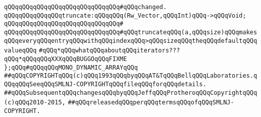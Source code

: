 \verb|qQQqqQQqqQQqqQQqqQQqqQQqqQQqqQQq#qQQqchanged.|\newline
\newline
\newline
\verb|qQQqqQQqqQQqqQQqtruncate:qQQqqQQq(Rw_Vector,qQQqInt)qQQq->qQQqVoid;|\newline
\verb|qQQqqQQqqQQqqQQqqQQqqQQqqQQqqQQq#|\newline
\verb|qQQqqQQqqQQqqQQqqQQqqQQqqQQqqQQq#qQQqtruncateqQQq(a,qQQqsize)qQQqmakesqQQqeveryqQQqentryqQQqwithqQQqindexqQQq>qQQqsizeqQQqtheqQQqdefaultqQQqvalueqQQq|\newline
\newline
\verb|#qQQq*qQQqwhatqQQqaboutqQQqiterators???qQQq*qQQqqQQqXXXqQQqBUGGOqQQqFIXME|\newline
\newline
\verb|};qQQq#qQQqqQQqMONO_DYNAMIC_ARRAYqQQq|\newline
\newline
\newline
\newline
\verb|##qQQqCOPYRIGHTqQQq(c)qQQq1993qQQqbyqQQqAT&TqQQqBellqQQqLaboratories.qQQqqQQqSeeqQQqSMLNJ-COPYRIGHTqQQqfileqQQqforqQQqdetails.|\newline
\verb|##qQQqSubsequentqQQqchangesqQQqbyqQQqJeffqQQqProtheroqQQqCopyrightqQQq(c)qQQq2010-2015,|\newline
\verb|##qQQqreleasedqQQqperqQQqtermsqQQqofqQQqSMLNJ-COPYRIGHT.|\newline

